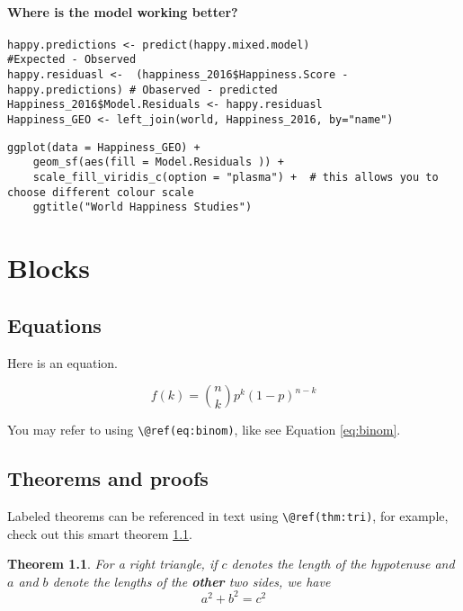 \documentclass[
]{book}
\newtheorem{theorem}{Theorem}[chapter]
\theoremstyle{definition}
\theoremstyle{definition}
\theoremstyle{definition}
\theoremstyle{definition}
\theoremstyle{remark}
\begin{document}
\hypertarget{where-is-the-model-working-better}{%
\subsubsection{Where is the model working better?}\label{where-is-the-model-working-better}}

\begin{verbatim}
happy.predictions <- predict(happy.mixed.model)
#Expected - Observed
happy.residuasl <-  (happiness_2016$Happiness.Score - happy.predictions) # Obaserved - predicted
Happiness_2016$Model.Residuals <- happy.residuasl
Happiness_GEO <- left_join(world, Happiness_2016, by="name")
\end{verbatim}

\begin{verbatim}
ggplot(data = Happiness_GEO) +
    geom_sf(aes(fill = Model.Residuals )) +
    scale_fill_viridis_c(option = "plasma") +  # this allows you to choose different colour scale
    ggtitle("World Happiness Studies")
\end{verbatim}

\hypertarget{blocks}{%
\chapter{Blocks}\label{blocks}}

\hypertarget{equations}{%
\section{Equations}\label{equations}}

Here is an equation.

\begin{equation} 
  f\left(k\right) = \binom{n}{k} p^k\left(1-p\right)^{n-k}
  \label{eq:binom}
\end{equation}

You may refer to using \texttt{\textbackslash{}@ref(eq:binom)}, like see Equation \eqref{eq:binom}.

\hypertarget{theorems-and-proofs}{%
\section{Theorems and proofs}\label{theorems-and-proofs}}

Labeled theorems can be referenced in text using \texttt{\textbackslash{}@ref(thm:tri)}, for example, check out this smart theorem \ref{thm:tri}.

\begin{theorem}
\protect\hypertarget{thm:tri}{}\label{thm:tri}For a right triangle, if \(c\) denotes the \emph{length} of the hypotenuse
and \(a\) and \(b\) denote the lengths of the \textbf{other} two sides, we have
\[a^2 + b^2 = c^2\]
\end{theorem}
\end{document}
